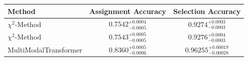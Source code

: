     \begin{tabular}{lcc}
        \toprule
        Method & Assignment Accuracy & Selection Accuracy \\
        \midrule
        $\chi^2$-Method & $0.7542^{+0.0004}_{-0.0005}$ & $0.9274^{+0.0003}_{-0.0003}$ \\
        $\chi^2$-Method & $0.7543^{+0.0005}_{-0.0005}$ & $0.9276^{+0.0004}_{-0.0003}$ \\
        MultiModalTransformer & $0.8360^{+0.0005}_{-0.0006}$ & $0.96255^{+0.00019}_{-0.00028}$ \\
        \bottomrule
    \end{tabular}